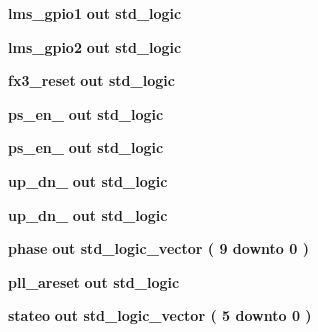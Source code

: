 \begin{DoxyCompactItemize}
\item 
{\bf lms\+\_\+gpio1}  {\bfseries {\bfseries \textcolor{keywordflow}{out}\textcolor{vhdlchar}{ }}} {\bfseries \textcolor{comment}{std\+\_\+logic}\textcolor{vhdlchar}{ }} 
\item 
{\bf lms\+\_\+gpio2}  {\bfseries {\bfseries \textcolor{keywordflow}{out}\textcolor{vhdlchar}{ }}} {\bfseries \textcolor{comment}{std\+\_\+logic}\textcolor{vhdlchar}{ }} 
\item 
{\bf fx3\+\_\+reset}  {\bfseries {\bfseries \textcolor{keywordflow}{out}\textcolor{vhdlchar}{ }}} {\bfseries \textcolor{comment}{std\+\_\+logic}\textcolor{vhdlchar}{ }} 
\item 
{\bf ps\+\_\+en\+\_}  {\bfseries {\bfseries \textcolor{keywordflow}{out}\textcolor{vhdlchar}{ }}} {\bfseries \textcolor{comment}{std\+\_\+logic}\textcolor{vhdlchar}{ }} 
\item 
{\bf ps\+\_\+en\+\_}  {\bfseries {\bfseries \textcolor{keywordflow}{out}\textcolor{vhdlchar}{ }}} {\bfseries \textcolor{comment}{std\+\_\+logic}\textcolor{vhdlchar}{ }} 
\item 
{\bf up\+\_\+dn\+\_}  {\bfseries {\bfseries \textcolor{keywordflow}{out}\textcolor{vhdlchar}{ }}} {\bfseries \textcolor{comment}{std\+\_\+logic}\textcolor{vhdlchar}{ }} 
\item 
{\bf up\+\_\+dn\+\_}  {\bfseries {\bfseries \textcolor{keywordflow}{out}\textcolor{vhdlchar}{ }}} {\bfseries \textcolor{comment}{std\+\_\+logic}\textcolor{vhdlchar}{ }} 
\item 
{\bf phase}  {\bfseries {\bfseries \textcolor{keywordflow}{out}\textcolor{vhdlchar}{ }}} {\bfseries \textcolor{comment}{std\+\_\+logic\+\_\+vector}\textcolor{vhdlchar}{ }\textcolor{vhdlchar}{(}\textcolor{vhdlchar}{ }\textcolor{vhdlchar}{ } \textcolor{vhdldigit}{9} \textcolor{vhdlchar}{ }\textcolor{keywordflow}{downto}\textcolor{vhdlchar}{ }\textcolor{vhdlchar}{ } \textcolor{vhdldigit}{0} \textcolor{vhdlchar}{ }\textcolor{vhdlchar}{)}\textcolor{vhdlchar}{ }} 
\item 
{\bf pll\+\_\+areset}  {\bfseries {\bfseries \textcolor{keywordflow}{out}\textcolor{vhdlchar}{ }}} {\bfseries \textcolor{comment}{std\+\_\+logic}\textcolor{vhdlchar}{ }} 
\item 
{\bf stateo}  {\bfseries {\bfseries \textcolor{keywordflow}{out}\textcolor{vhdlchar}{ }}} {\bfseries \textcolor{comment}{std\+\_\+logic\+\_\+vector}\textcolor{vhdlchar}{ }\textcolor{vhdlchar}{(}\textcolor{vhdlchar}{ }\textcolor{vhdlchar}{ } \textcolor{vhdldigit}{5} \textcolor{vhdlchar}{ }\textcolor{keywordflow}{downto}\textcolor{vhdlchar}{ }\textcolor{vhdlchar}{ } \textcolor{vhdldigit}{0} \textcolor{vhdlchar}{ }\textcolor{vhdlchar}{)}\textcolor{vhdlchar}{ }} 

\end{DoxyCompactItemize}
